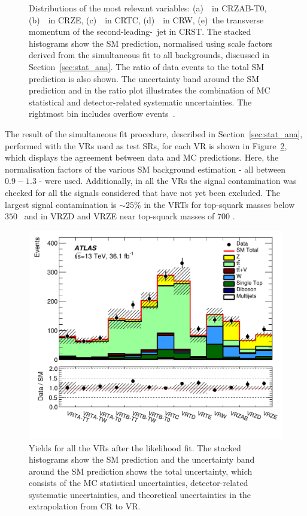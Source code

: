 \begin{figure}[!htb]
		    \caption{Distributions of the most relevant variables: (a)~\mttwoprime\ in CRZAB-T0, (b)~\metprime\ in CRZE, (c)~\rISR\ in CRTC, (d)~\mtbmax\ in CRW, (e)~the transverse momentum of the second-leading-\pT\ jet in CRST. The stacked histograms show the \ac{SM} prediction, normalised using scale factors derived from the simultaneous fit to all backgrounds, discussed in Section~\ref{sec:stat_ana}. The ratio of data events to the total \ac{SM} prediction is also shown. The uncertainty band around the \ac{SM} prediction and in the ratio plot illustrates the combination of \ac{MC} statistical and detector-related systematic uncertainties. The rightmost bin includes overflow events~\cite{stop0L}.}
		    \label{fig:CRs}
			\end{figure}

			The result of the simultaneous fit procedure, described in Section~\ref{sec:stat_ana}, performed with the \acp{VR} used as test \acp{SR}, for each \ac{VR} is shown in Figure~\ref{fig:VRs}, which displays the agreement between data and \ac{MC} predictions. Here, the normalisation factors of the various \ac{SM} background estimation - all between $0.9 - 1.3$ - were used. Additionally, in all the \acp{VR} the signal contamination was checked for all the signals considered that have not yet been excluded. The largest signal contamination is $\sim 25\%$ in the VRTs for top-squark masses below $350$ \GeV\ and in VRZD and VRZE near top-squark masses of $700$ \GeV.

			\begin{figure}[!htb]
			  \begin{center}
			    \includegraphics[width=.8\textwidth]{figures/stop/regionSummaryVR}
			    \caption{Yields for all the \acp{VR} after the likelihood fit. The stacked histograms show the \ac{SM} prediction and the uncertainty band around the \ac{SM} prediction shows the total uncertainty, which consists of the \ac{MC} statistical uncertainties, detector-related systematic uncertainties, and theoretical uncertainties in the extrapolation from \ac{CR} to \ac{VR}.} 
			    \label{fig:VRs}
			  \end{center}
			\end{figure}


